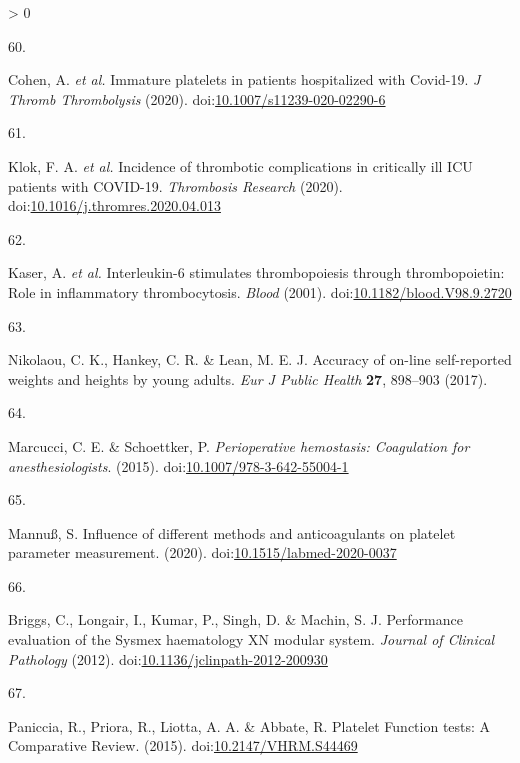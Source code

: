 \documentclass[11pt,twoside]{bristolthesis}
\newlength{\cslhangindent}
\newlength{\csllabelwidth}
\newenvironment{CSLReferences}[2] %
 {%
  \setlength{\parindent}{0pt}
  \ifodd #1 \everypar{\setlength{\hangindent}{\cslhangindent}}\ignorespaces\fi
  \ifnum #2 > 0
  \setlength{\parskip}{#2\baselineskip}
  \fi
 }%
 {}
\newcommand{\CSLLeftMargin}[1]{\parbox[t]{\csllabelwidth}{#1}}
\newcommand{\CSLRightInline}[1]{\parbox[t]{\linewidth - \csllabelwidth}{#1}\break}
\begin{document}
\begin{CSLReferences}{0}{0}
\leavevmode\hypertarget{ref-Cohen2020}{}%
\CSLLeftMargin{60. }
\CSLRightInline{Cohen, A. \emph{et al.} {Immature platelets in patients hospitalized with Covid-19}. \emph{J Thromb Thrombolysis} (2020). doi:\href{https://doi.org/10.1007/s11239-020-02290-6}{10.1007/s11239-020-02290-6}}

\leavevmode\hypertarget{ref-Klok2020}{}%
\CSLLeftMargin{61. }
\CSLRightInline{Klok, F. A. \emph{et al.} {Incidence of thrombotic complications in critically ill ICU patients with COVID-19}. \emph{Thrombosis Research} (2020). doi:\href{https://doi.org/10.1016/j.thromres.2020.04.013}{10.1016/j.thromres.2020.04.013}}

\leavevmode\hypertarget{ref-Kaser2001}{}%
\CSLLeftMargin{62. }
\CSLRightInline{Kaser, A. \emph{et al.} {Interleukin-6 stimulates thrombopoiesis through thrombopoietin: Role in inflammatory thrombocytosis}. \emph{Blood} (2001). doi:\href{https://doi.org/10.1182/blood.V98.9.2720}{10.1182/blood.V98.9.2720}}

\leavevmode\hypertarget{ref-Nikolaou2017}{}%
\CSLLeftMargin{63. }
\CSLRightInline{Nikolaou, C. K., Hankey, C. R. \& Lean, M. E. J. {Accuracy of on-line self-reported weights and heights by young adults}. \emph{Eur J Public Health} \textbf{27}, 898--903 (2017).}

\leavevmode\hypertarget{ref-Marcucci2015}{}%
\CSLLeftMargin{64. }
\CSLRightInline{Marcucci, C. E. \& Schoettker, P. \emph{{Perioperative hemostasis: Coagulation for anesthesiologists}}. (2015). doi:\href{https://doi.org/10.1007/978-3-642-55004-1}{10.1007/978-3-642-55004-1}}

\leavevmode\hypertarget{ref-Mannuuxdf2020}{}%
\CSLLeftMargin{65. }
\CSLRightInline{Mannuß, S. {Influence of different methods and anticoagulants on platelet parameter measurement}. (2020). doi:\href{https://doi.org/10.1515/labmed-2020-0037}{10.1515/labmed-2020-0037}}

\leavevmode\hypertarget{ref-Briggs2012}{}%
\CSLLeftMargin{66. }
\CSLRightInline{Briggs, C., Longair, I., Kumar, P., Singh, D. \& Machin, S. J. {Performance evaluation of the Sysmex haematology XN modular system}. \emph{Journal of Clinical Pathology} (2012). doi:\href{https://doi.org/10.1136/jclinpath-2012-200930}{10.1136/jclinpath-2012-200930}}

\leavevmode\hypertarget{ref-Paniccia2015}{}%
\CSLLeftMargin{67. }
\CSLRightInline{Paniccia, R., Priora, R., Liotta, A. A. \& Abbate, R. {Platelet Function tests: A Comparative Review}. (2015). doi:\href{https://doi.org/10.2147/VHRM.S44469}{10.2147/VHRM.S44469}}


\end{CSLReferences}
\end{document}
